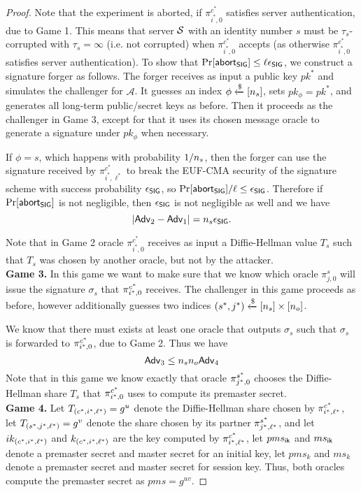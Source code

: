\begin{proof}
 Note that the experiment is aborted, if $\pi^{c^{\ast}}_{i^{\ast},0}$ satisfies server authentication, due to Game 1. This means that server $\mathcal{S}$ with an identity number $s$ must be $\tau_s$-corrupted with $\tau_s = \infty$ (i.e. not corrupted) when $\pi^{c^{\ast}}_{i^{\ast},0}$ accepts (as otherwise $\pi^{c^{\ast}}_{i^{\ast},0}$ satisfies server authentication). To show that $\Pr[\mathsf{abort}_{\mathsf{SIG}}] \leq \ell \epsilon_{\mathsf{SIG}}$, we construct a signature forger as follows. The forger receives as input a public key $pk^{\ast}$ and simulates the challenger for $\mathcal{A}$. It guesses an index $\phi \xleftarrow{\$}[n_s]$, sets $pk_{\phi} = pk^{\ast}$, and generates all long-term public/secret keys as before. Then it proceeds as the challenger in Game 3, except for that it uses its chosen message oracle to generate a signature under $pk_{\phi}$ when necessary.

 If $\phi = s$, which happens with probability $1/n_s$, then the forger can use the signature received by $\pi^{c^{\ast}}_{i^{\ast},\ell^{\ast}}$ to break the EUF-CMA security of the signature scheme with success probability $\epsilon_{\mathsf{SIG}}$, so $\Pr[\mathsf{abort}_{\mathsf{SIG}}]/\ell \leq \epsilon_{\mathsf{SIG}}$. Therefore if $\Pr[\mathsf{abort}_{\mathsf{SIG}}]$ is not negligible, then $\epsilon_{\mathsf{SIG}}$ is not negligible as well and we have
 \begin{equation}
  |\mathsf{Adv}_2 - \mathsf{Adv}_1| = n_s \epsilon_{\mathsf{SIG}}.
 \end{equation}%

 Note that in Game 2 oracle $\pi^{c^{\ast}}_{i^{\ast},0}$ receives as input a Diffie-Hellman value $T_s$ such that $T_s$ was chosen by another oracle, but not by the attacker.
\vspace{10pt}\\%
%
%
 \textbf{Game 3.} In this game we want to make sure that we know which oracle $\pi^s_{j,0}$ will issue the signature $\sigma_s$ that $\pi^{c^{\ast}}_{i^{\ast},0}$ receives. The challenger in this game proceeds as before, however additionally guesses two indices $(s^{\ast}, j^{\ast}) \xleftarrow{\$} [n_s] \times [n_o]$.

 We know that there must exists at least one oracle that outputs $\sigma_s$ such that $\sigma_s$ is forwarded to $\pi^{c^{\ast}}_{i^{\ast},0}$, due to Game 2. Thus we have
 \begin{equation}
  \mathsf{Adv}_3 \leq n_s n_o \mathsf{Adv}_4
 \end{equation}%
 Note that in this game we know exactly that oracle $\pi^{s^{\ast}}_{j^{\ast},0}$ chooses the Diffie-Hellman share $T_s$ that $\pi^{c^{\ast}}_{i^{\ast},0}$ uses to compute its premaster secret.
 \vspace{10pt}\\
%
%
 \textbf{Game 4.} Let $T_{(c^{\ast}, {i^{\ast}, \ell^{\ast})}} = g^u$ denote the Diffie-Hellman share chosen by $\pi^{c^{\ast}}_{i^{\ast},\ell^{\ast}}$, let $T_{(s^{\ast}, {j^{\ast}, \ell^{\ast})}} = g^v$ denote the share chosen by its partner $\pi^{s^{\ast}}_{j^{\ast},\ell^{\ast}}$, and let $ik_{(c^{\ast}, {i^{\ast}, \ell^{\ast})}}$ and $k_{(c^{\ast}, {i^{\ast}, \ell^{\ast})}}$ are the key computed by $\pi^{c^{\ast}}_{i^{\ast},\ell^{\ast}}$, let $pms_{\mathsf{ik}}$ and $ms_{\mathsf{ik}}$ denote a premaster secret and master secret for an initial key, let $pms_{k}$ and $ms_{k}$ denote a premaster secret and master secret for session key. Thus, both oracles compute the premaster secret as $pms = g^{uv}$.


\end{proof}
